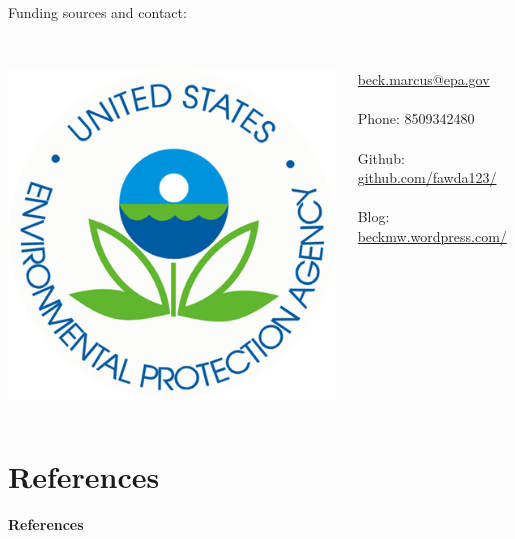 \documentclass[serif]{beamer}\usepackage[]{graphicx}\usepackage[]{color}
\begin{document}
\begin{frame}
\begin{columns}
\begin{column}{0.3\textwidth}
\begin{center}
{}
\end{center}
\end{column}
\end{columns}
\vfill
Funding sources and contact:\\~\\
\begin{columns}
\begin{column}{0.5\textwidth}
\centerline{\includegraphics[width=0.4\linewidth]{fig/epa_logo.png}}
\end{column}
\begin{column}{0.5\textwidth}
\scriptsize
\href{mailto:beck.marcus@epa.gov}{beck.marcus@epa.gov} \\~\\
Phone: 8509342480 \\~\\
Github: \href{https://github.com/fawda123/}{github.com/fawda123/} \\~\\
Blog: \href{http://beckmw.wordpress.com/}{beckmw.wordpress.com/}
\end{column}
\end{columns}
\vspace{0.2in}
\end{frame}

\section{References}
\begin{frame}[allowframebreaks,t]{\textbf{References}}
\tiny
{}


\end{frame}
\end{document}
